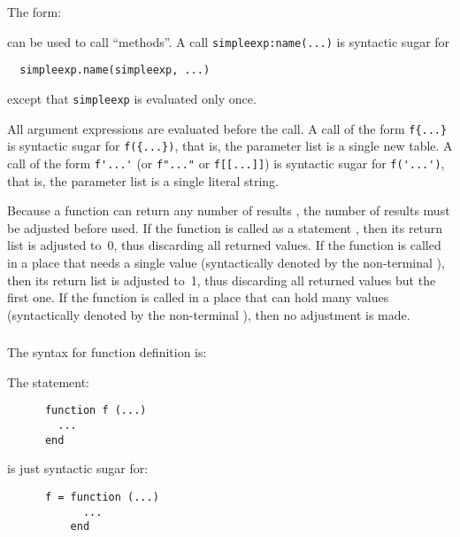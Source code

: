 The form:
\begin{Produc}
\end{Produc}%
can be used to call ``methods''.
A call \verb|simpleexp:name(...)|
is syntactic sugar for
\begin{verbatim}
  simpleexp.name(simpleexp, ...)
\end{verbatim}
except that \verb|simpleexp| is evaluated only once.

\begin{Produc}
\end{Produc}%
All argument expressions are evaluated before the call.
A call of the form \verb|f{...}| is syntactic sugar for
\verb|f({...})|, that is,
the parameter list is a single new table.
A call of the form \verb|f'...'|
(or \verb|f"..."| or \verb|f[[...]]|) is syntactic sugar for
\verb|f('...')|, that is,
the parameter list is a single literal string.

Because a function can return any number of results
,
the number of results must be adjusted before used.
If the function is called as a statement ,
then its return list is adjusted to~0,
thus discarding all returned values.
If the function is called in a place that needs a single value
(syntactically denoted by the non-terminal ),
then its return list is adjusted to~1,
thus discarding all returned values but the first one.
If the function is called in a place that can hold many values
(syntactically denoted by the non-terminal ),
then no adjustment is made.

\subsubsection{} \label{func-def}

The syntax for function definition is:
\begin{Produc}
\end{Produc}
The statement:
\begin{verbatim}
      function f (...)
        ...
      end
\end{verbatim}
is just syntactic sugar for:
\begin{verbatim}
      f = function (...)
            ...
          end
\end{verbatim}

